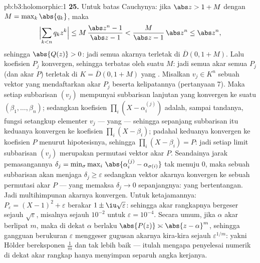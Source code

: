 \begin{solution}{pb:b3:holomorphic:1}
\textbf{25.} Untuk batas Cauchynya: jika $\abs z > 1 + M$ dengan $M =
\max_k\abs{q_k}$, maka
\[
\Bigl|\sum_{k<n}q_kz^k\Bigr|
\leq M\,\frac{\abs z^n - 1}{\abs z - 1}
< \frac{M}{\abs z - 1}\,\abs z^n \leq \abs z^n,
\]
sehingga $\abs{Q(z)} > 0$: jadi semua akarnya terletak di $\overline D(0, 1+M)$.
Lalu koefisien $P_j$ konvergen, sehingga terbatas oleh
suatu $M$: jadi semua akar semua $P_j$ (dan akar $P$) terletak di
$K = \overline D(0, 1 + M)$ yang . Misalkan $v_j \in K^n$ sebuah
vektor yang mendaftarkan akar $P_j$ beserta kelipatannya
(pertanyaan 7). Maka setiap subbarisan $(v_j)$ mempunyai subbarisan
lanjutan yang konvergen ke suatu $(\beta_1, \dots, \beta_n)$;
sedangkan koefisien $\prod_i(X - \alpha_i^{(j)})$ adalah, sampai
tandanya, fungsi setangkup elementer $v_j$ ---
yang  --- sehingga sepanjang subbarisan itu keduanya konvergen ke
koefisien $\prod_i(X - \beta_i)$; padahal keduanya
konvergen ke koefisien $P$ menurut hipotesisnya, sehingga $\prod_i(X -
\beta_i) = P$: jadi setiap limit subbarisan $(v_j)$ merupakan
permutasi vektor akar $P$. Seandainya jarak pemasangannya
$\delta_j = \min_\sigma\max_i\,
\abs{\alpha_i^{(j)} - \alpha_{\sigma(i)}}$ tak menuju
$0$, maka sebuah subbarisan akan menjaga $\delta_j \geq \varepsilon$
sedangkan vektor akarnya konvergen ke sebuah permutasi
akar $P$ --- yang memaksa $\delta_j \to 0$ sepanjangnya:
yang bertentangan. Jadi multihimpunan akarnya konvergen. Untuk ketajamannya:
$P_\varepsilon = (X - 1)^2 + \varepsilon$ berakar $1 \pm
\iu\sqrt\varepsilon$: sehingga akar rangkapnya bergeser sejauh
$\sqrt\varepsilon$, misalnya sejauh $10^{-2}$ untuk $\varepsilon =
10^{-4}$. Secara umum, jika $\alpha$ akar berlipat $m$, maka
di dekat $\alpha$ berlaku $\abs{P(z)} \asymp \abs{z -
\alpha}^m$, sehingga gangguan berukuran $\varepsilon$ menggeser
gugusan akarnya kira-kira sejauh $\varepsilon^{1/m}$: yakni 
Hölder bereksponen $\frac1m$ dan tak lebih baik --- itulah
mengapa penyelesai numerik di dekat akar rangkap hanya menyimpan separuh
angka kerjanya.

\end{solution}
